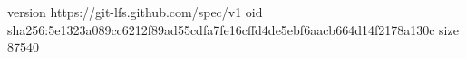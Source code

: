 version https://git-lfs.github.com/spec/v1
oid sha256:5e1323a089cc6212f89ad55cdfa7fe16cffd4de5ebf6aacb664d14f2178a130c
size 87540
